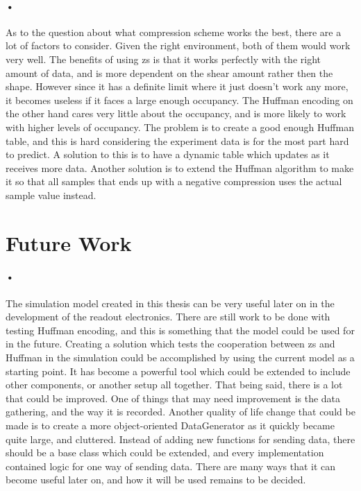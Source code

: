 \documentclass[a4paper, 12pt]{report}
\begin{document}
\paragraph{•}
As to the question about what compression scheme works the best, there are a lot of factors to consider.
Given the right environment, both of them would work very well.
The benefits of using \gls{zs} is that it works perfectly with the right amount of data, and is more dependent on the shear amount rather then the shape.
However since it has a definite limit where it just doesn't work any more, it becomes useless if it faces a large enough occupancy.
The Huffman encoding on the other hand cares very little about the occupancy, and is more likely to work with higher levels of occupancy.
The problem is to create a good enough Huffman table, and this is hard considering the experiment data is for the most part hard to predict.
A solution to this is to have a dynamic table which updates as it receives more data.
Another solution is to extend the Huffman algorithm to make it so that all samples that ends up with a negative compression uses the actual sample value instead.

\section{Future Work}

\paragraph{•}
The simulation model created in this thesis can be very useful later on in the development of the readout electronics.
There are still work to be done with testing Huffman encoding, and this is something that the model could be used for in the future.
Creating a solution which tests the cooperation between \gls{zs} and Huffman in the simulation could be accomplished by using the current model as a starting point.
It has become a powerful tool which could be extended to include other components, or another setup all together.
That being said, there is a lot that could be improved.
One of things that may need improvement is the data gathering, and the way it is recorded.
Another quality of life change that could be made is to create a more object-oriented DataGenerator as it quickly became quite large, and cluttered.
Instead of adding new functions for sending data, there should be a base class which could be extended, and every implementation contained logic for one way of sending data.
There are many ways that it can become useful later on, and how it will be used remains to be decided.
\end{document}
